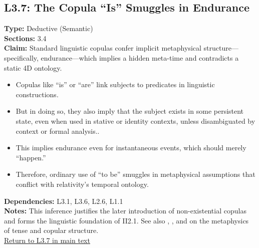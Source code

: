 \documentclass[12pt]{book}
\newcommand{\returnlink}[1]{\hyperref[logic:#1]{Return to #1 in main text}\xspace}
\begin{document}
\subsection*{L3.7: The Copula ``Is'' Smuggles in Endurance}\label{appendix:L3.7}
\textbf{Type:} Deductive (Semantic) \\
\textbf{Sections:} 3.4 \\
\textbf{Claim:} Standard linguistic copulas confer implicit metaphysical structure---specifically, endurance---which implies a hidden meta-time and contradicts a static 4D ontology.
\begin{itemize}
  \item Copulas like ``is'' or ``are'' link subjects to predicates in linguistic constructions.
  \item But in doing so, they also imply that the subject exists in some persistent state, even when used in stative or identity contexts, unless disambiguated by context or formal analysis..
  \item This implies endurance even for instantaneous events, which should merely ``happen.''
  \item Therefore, ordinary use of ``to be'' smuggles in metaphysical assumptions that conflict with relativity's temporal ontology.
\end{itemize}
\textbf{Dependencies:} L3.1, L3.6, L2.6, L1.1 \\
\textbf{Notes:} This inference justifies the later introduction of non-existential copulas and forms the linguistic foundation of II2.1. See also \cite{Davidson1967}, \cite{Quine1948}, and \cite{Prior1967} on the metaphysics of tense and copular structure.\\
\returnlink{L3.7}
\end{document}
